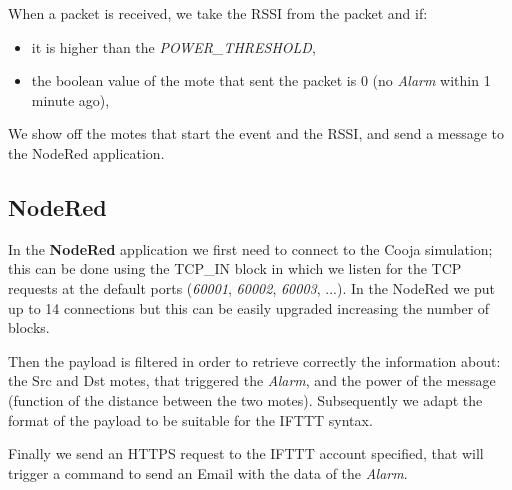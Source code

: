 When a packet is received, we take the RSSI from the packet and if:
\begin{itemize}
    \item it is higher than the \textit{POWER_THRESHOLD},
    \item the boolean value of the mote that sent the packet is 0 (no \textit{Alarm} within 1 minute ago),
\end{itemize}
We show off the motes that start the event and the RSSI, and send a message to the NodeRed application.



\subsection{NodeRed}
In the \textbf{NodeRed} application we first need to connect to the Cooja simulation;
this can be done using the TCP_IN block in which we listen for the TCP requests
at the default ports (\textit{60001}, \textit{60002}, \textit{60003}, ...).
In the NodeRed we put up to 14 connections but this can be easily upgraded
increasing the number of blocks.

Then the payload is filtered in order to retrieve correctly the information 
about: the Src and Dst motes, that triggered the \textit{Alarm},  and the power of the message (function 
of the distance between the two motes).
Subsequently we adapt the format of the payload to be suitable for the 
IFTTT syntax.

Finally we send an HTTPS request to the IFTTT account specified, that will trigger a command
to send an Email with the data of the \textit{Alarm}.